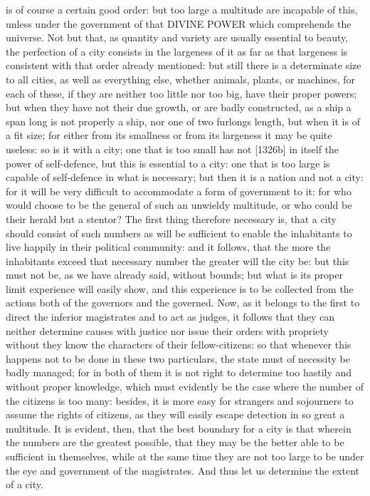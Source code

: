 is of course a certain good order: but too large a multitude are incapable
of this, unless under the government of that DIVINE POWER which
comprehends the universe. Not but that, as quantity and variety are
usually essential to beauty, the perfection of a city consists in the
largeness of it as far as that largeness is consistent with that order
already mentioned: but still there is a determinate size to all cities, as
well as everything else, whether animals, plants, or machines, for each of
these, if they are neither too little nor too big, have their proper
powers; but when they have not their due growth, or are badly constructed,
as a ship a span long is not properly a ship, nor one of two furlongs
length, but when it is of a fit size; for either from its smallness or
from its largeness it may be quite useless: so is it with a city; one that
is too small has not [1326b] in itself the power of self-defence, but this
is essential to a city: one that is too large is capable of self-defence
in what is necessary; but then it is a nation and not a city: for it will
be very difficult to accommodate a form of government to it: for who would
choose to be the general of such an unwieldy multitude, or who could be
their herald but a stentor? The first thing therefore necessary is, that a
city should consist of such numbers as will be sufficient to enable the
inhabitants to live happily in their political community: and it follows,
that the more the inhabitants exceed that necessary number the greater
will the city be: but this must not be, as we have already said, without
bounds; but what is its proper limit experience will easily show, and this
experience is to be collected from the actions both of the governors and
the governed. Now, as it belongs to the first to direct the inferior
magistrates and to act as judges, it follows that they can neither
determine causes with justice nor issue their orders with propriety
without they know the characters of their fellow-citizens: so that
whenever this happens not to be done in these two particulars, the state
must of necessity be badly managed; for in both of them it is not right to
determine too hastily and without proper knowledge, which must evidently
be the case where the number of the citizens is too many: besides, it is
more easy for strangers and sojourners to assume the rights of citizens,
as they will easily escape detection in so great a multitude. It is
evident, then, that the best boundary for a city is that wherein the
numbers are the greatest possible, that they may be the better able to be
sufficient in themselves, while at the same time they are not too large to
be under the eye and government of the magistrates. And thus let us
determine the extent of a city.

